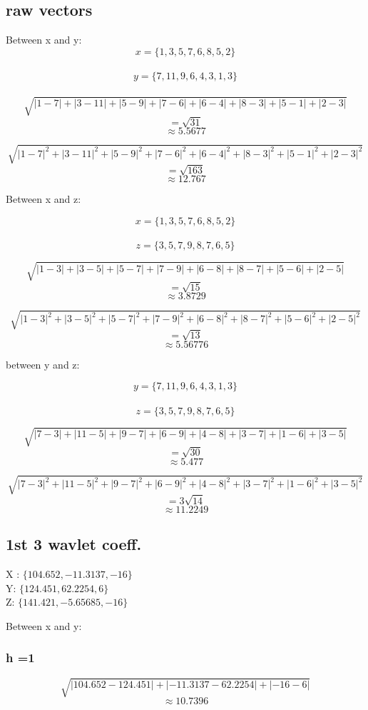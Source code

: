 \documentclass{article}
\begin{document}
\subsection{raw vectors}
Between x and y:
\[ x = \{1, 3, 5, 7, 6, 8, 5, 2\}  \] \\
\[ 	y = \{7, 11, 9, 6, 4, 3, 1, 3\}  \] \\

\[ \sqrt{ | 1-7 | + |3 -11| + |5-9| + 
  |7-6| + |6-4| + |8-3| + |5-1| + |2-3|} \]
  \[ =\sqrt{31} \]
  \[ \approx 5.5677\]

\[ \sqrt{ | 1-7 |^2 + |3 -11|^2 + |5-9|^2 + 
  |7-6|^2 + |6-4|^2 + |8-3|^2 + |5-1|^2 + |2-3|^2} \]
  \[ = \sqrt{163} \]
  \[ \approx 12.767 \]

  Between x and z:

\[ x = \{1, 3, 5, 7, 6, 8, 5, 2\}  \] \\
\[ z = \{3, 5, 7, 9, 8, 7, 6, 5 \} \]

\[ \sqrt{ | 1-3 | + |3 -5| + |5-7| + 
  |7-9| + |6-8| + |8-7| + |5-6| + |2-5|} \]
  \[ = \sqrt{15} \]
  \[ \approx 3.8729 \]

\[ \sqrt{ | 1-3 |^2 + |3 -5|^2 + |5-7|^2 + 
  |7-9|^2 + |6-8|^2 + |8-7|^2 + |5-6|^2 + |2-5|^2} \]
  \[ = \sqrt{13} \]
  \[ \approx 5.56776 \]


  between y and z:

\[ y = \{7, 11, 9, 6, 4, 3, 1, 3\}  \] \\
 \[ z = \{3, 5, 7, 9, 8, 7, 6, 5 \} \]

\[ \sqrt{ | 7-3 | + |11 -5| + |9-7| + 
  |6-9| + |4-8| + |3-7| + |1-6| + |3-5|} \]
  \[ = \sqrt{30} \]
  \[ \approx 5.477 \]

\[ \sqrt{ | 7-3 |^2 + |11 -5|^2 + |9-7|^2 + 
  |6-9|^2 + |4-8|^2 + |3-7|^2 + |1-6|^2 + |3-5|^2} \]
  \[ =3 \sqrt{14} \]
  \[ \approx 11.2249 \]


\subsection{1st 3 wavlet coeff.}
X : $\{104.652, -11.3137, -16 \}$ \\
Y: $ \{ 124.451, 62.2254, 6 \}$  \\
Z: $ \{141.421, -5.65685, -16 \} $



Between x and y:\\ 
\subsubsection{h =1}
\[ \sqrt{ | 104.652-124.451 | + |-11.3137 -62.2254| + |-16-6| } \]
  \[ \approx 10.7396 \]
\end{document}
